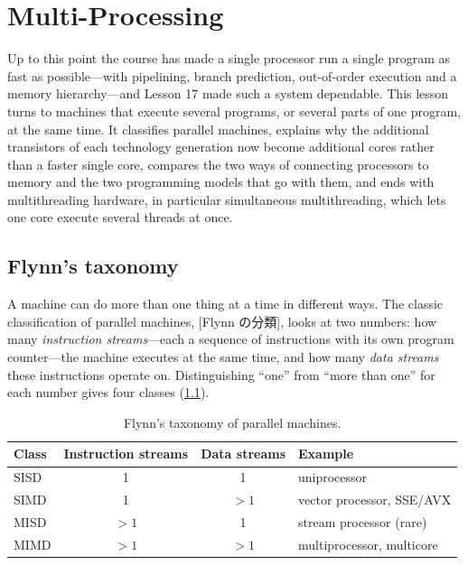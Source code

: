 \documentclass[../main.tex]{subfiles}
\begin{document}
\chapter{Multi-Processing}

Up to this point the course has made a single processor run a single
program as fast as possible---with pipelining, branch prediction,
out-of-order execution and a memory hierarchy---and Lesson 17 made such a
system dependable.  This lesson turns to machines that execute several
programs, or several parts of one program, at the same time.  It classifies
parallel machines, explains why the additional transistors of each
technology generation now become additional cores rather than a faster
single core, compares the two ways of connecting processors to memory and
the two programming models that go with them, and ends with multithreading
hardware, in particular simultaneous multithreading, which lets one core
execute several threads at once.

\section{Flynn's taxonomy}
\label{sec:l18-flynn}

A machine can do more than one thing at a time in different
ways.  The
classic classification of parallel machines,
[Flynn の分類], looks at two numbers: how many \emph{instruction streams}---each a
sequence of instructions with its own program counter---the machine executes
at the same time, and how many \emph{data streams} these instructions
operate on.  Distinguishing \enquote{one} from \enquote{more than one} for
each number gives four classes (\cref{tab:l18-flynn}).

\begin{table}[htbp]
  \centering\small
  \caption{Flynn's taxonomy of parallel machines.}
  \label{tab:l18-flynn}
  \begin{tabular}{@{}lccl@{}}
    \toprule
    Class & Instruction streams & Data streams & Example \\
    \midrule
    SISD & 1        & 1        & uniprocessor \\
    SIMD & 1        & $>1$     & vector processor, SSE/AVX \\
    MISD & $>1$     & 1        & stream processor (rare) \\
    MIMD & $>1$     & $>1$     & multiprocessor, multicore \\
    \bottomrule
  \end{tabular}
\end{table}
\end{document}
